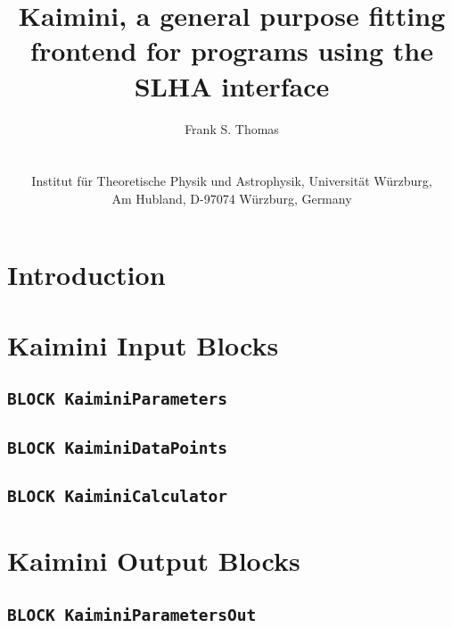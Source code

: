 \documentclass[a4paper,12pt]{article}
\title{\textbf{Kaimini, a general purpose fitting frontend for programs
  using the SLHA interface}}
\author{%
  Frank S. Thomas\\
  \ttt{\mailto{fthomas@physik.uni-wuerzburg.de}}\\
  \vspace{1em}\\
  Institut für Theoretische Physik und Astrophysik, Universität Würzburg,\\
  Am Hubland, D-97074 Würzburg, Germany}
\newcommand{\ttt}[1]{\texttt{#1}}
\begin{document}
\maketitle

\begin{abstract}
\end{abstract}

\tableofcontents

\section{Introduction\label{sec:introduction}}

\section{Kaimini Input Blocks\label{sec:kaimini_input_blocks}}

\subsection*{\ttt{BLOCK KaiminiParameters}}

\subsection*{\ttt{BLOCK KaiminiDataPoints}}

\subsection*{\ttt{BLOCK KaiminiCalculator}}


\section{Kaimini Output Blocks\label{sec:kaimini_output_blocks}}

\subsection*{\ttt{BLOCK KaiminiParametersOut}}
\end{document}
